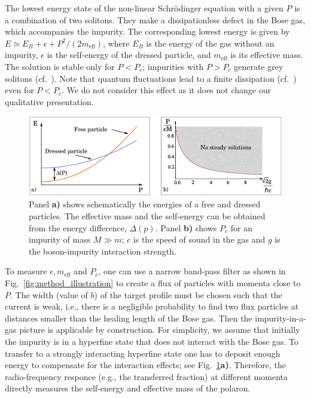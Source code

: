 \documentclass[reprint, twocolumn,amsmath,amssymb,showpacs,pra,superscriptaddress,aps]{revtex4-1}
\begin{document}
The lowest energy state of the non-linear Schr{\"o}dinger equation with a given $P$ is a combination of two solitons. They make a dissipationless defect in the Bose gas, which accompanies the impurity. The corresponding lowest energy is given by $E\simeq E_B+\epsilon+P^2/(2m_{\mathrm{eff}})$, where $E_B$ is the energy of the gas without an impurity, $\epsilon$ is the self-energy of the dressed particle, and $m_{\mathrm{eff}}$ is its effective mass. The solution is stable only for $P<P_c$; impurities with $P>P_c$ generate grey solitons (cf.~\cite{hakim1997}). Note that quantum fluctuations lead to a finite dissipation (cf.~\cite{astrakharchik2004,sykes2009,Cherny2012}) even for $P<P_c$. We do not consider this effect as it does not change our qualitative presentation.


\begin{figure}
\centerline{\includegraphics[scale=0.3]{figure3.pdf}}
\caption{Panel {\bf a)} shows schematically the energies of a free and dressed particles. 
The effective mass and the self-energy 
can be obtained from the energy difference, $\Delta(p)$.
Panel {\bf b)} shows $P_c$ for an impurity of mass $M\gg m$; 
$c$ is the speed of sound in the gas and $g$ is the boson-impurity interaction strength.
  }
\label{fig:Figure3}
\end{figure}



To measure $\epsilon, m_{\mathrm{eff}}$ and $P_c$, one can use a narrow band-pass filter as shown in Fig.~\ref{fig:method_illustration} to create a flux of particles with momenta close to $P$. 
The width (value of $b$) of the target profile must be chosen such that the current is weak, i.e., there is a negligible probability to find two flux particles at distances smaller than the healing 
length of the Bose gas. Then the impurity-in-a-gas picture is applicable by construction. 
For simplicity, we assume that initially the impurity is in a hyperfine state 
that does not interact with the Bose gas. To transfer to a strongly interacting hyperfine state 
one has to deposit enough energy to compensate for the interaction effects; see Fig.~\ref{fig:Figure3}{\bf a)}. 
Therefore, the radio-frequency responce (e.g., the transferred fraction) at different momenta directly measures 
the self-energy and effective mass of the polaron.
\end{document}
